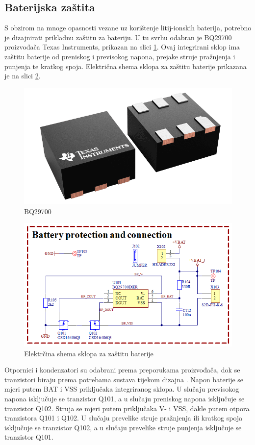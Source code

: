 \subsection{Baterijska zaštita}
S obzirom na mnoge opasnosti vezane uz korištenje litij-ionskih baterija, potrebno je dizajnirati prikladnu zaštitu za bateriju. U tu svrhu odabran je BQ29700 proizvođača Texas Instruments, prikazan na slici \ref{slk:BQ29700}. Ovaj integrirani sklop ima zaštitu baterije od preniskog i previsokog napona, prejake struje pražnjenja i punjenja te kratkog spoja. Električna shema sklopa za zaštitu baterije prikazana je na slici \ref{slk:MB_BATPROT}.
\begin{figure}[hbt]
    \centering
    \includegraphics[width=6 cm]{Figures/BQ29700.png}
    \caption{BQ29700}
    \label{slk:BQ29700}
\end{figure}
\begin{figure}[!hbt]
    \centering
    \includegraphics[width=10 cm]{Figures/MB_BATPROT.png}
    \caption{Elektrčina shema sklopa za zaštitu baterije}
    \label{slk:MB_BATPROT}
\end{figure}
Otpornici i kondenzatori su odabrani prema preporukama proizvođača, dok se tranzistori biraju prema potrebama sustava tijekom dizajna \cite{ti:bq29700}. Napon baterije se mjeri putem BAT i VSS priključaka integriranog sklopa. U slučaju previsokog napona isključuje se tranzistor Q101, a u slučaju preniskog napona isključuje se tranzistor Q102. Struja se mjeri putem priključaka V- i VSS, dakle putem otpora tranzistora Q101 i Q102. U slučaju prevelike struje pražnjenja ili kratkog spoja isključuje se tranzistor Q102, a u slučaju prevelike struje punjenja isključuje se tranzistor Q101.

